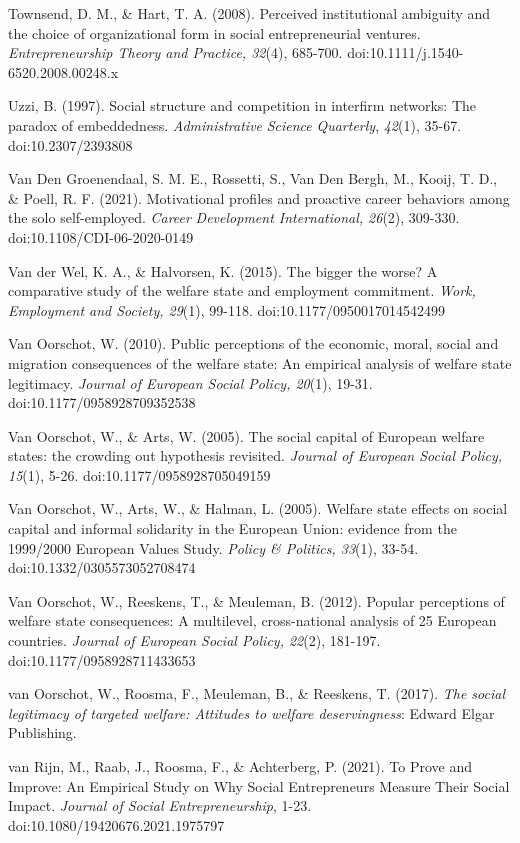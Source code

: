 \documentclass{article}
\begin{document}
Townsend, D. M., \& Hart, T. A. (2008). Perceived institutional ambiguity and the choice of organizational form in social entrepreneurial ventures. \emph{Entrepreneurship Theory and Practice, 32}(4), 685-700. doi:10.1111/j.1540-6520.2008.00248.x

Uzzi, B. (1997). Social structure and competition in interfirm networks: The paradox of embeddedness. \emph{Administrative}\emph{ }\emph{Science}\emph{ }\emph{Quarterly}, \emph{42}(1), 35-67. doi:10.2307/2393808

Van Den Groenendaal, S. M. E., Rossetti, S., Van Den Bergh, M., Kooij, T. D., \& Poell, R. F. (2021). Motivational profiles and proactive career behaviors among the solo self-employed. \emph{Career}\emph{ Development International, 26}(2), 309-330. doi:10.1108/CDI-06-2020-0149

Van der Wel, K. A., \& Halvorsen, K. (2015). The bigger the worse? A comparative study of the welfare state and employment commitment. \emph{Work, Employment and Society, 29}(1), 99-118. doi:10.1177/0950017014542499

Van Oorschot, W. (2010). Public perceptions of the economic, moral, social and migration consequences of the welfare state: An empirical analysis of welfare state legitimacy. \emph{Journal of European Social Policy, 20}(1), 19-31. doi:10.1177/0958928709352538

Van Oorschot, W., \& Arts, W. (2005). The social capital of European welfare states: the crowding out hypothesis revisited. \emph{Journal of European Social Policy, 15}(1), 5-26. doi:10.1177/0958928705049159 

Van Oorschot, W., Arts, W., \& Halman, L. (2005). Welfare state effects on social capital and informal solidarity in the European Union: evidence from the 1999/2000 European Values Study. \emph{Policy \& Politics, 33}(1), 33-54. doi:10.1332/0305573052708474

Van Oorschot, W., Reeskens, T., \& Meuleman, B. (2012). Popular perceptions of welfare state consequences: A multilevel, cross-national analysis of 25 European countries. \emph{Journal of European Social Policy, 22}(2), 181-197. doi:10.1177/0958928711433653

van Oorschot, W., Roosma, F., Meuleman, B., \& Reeskens, T. (2017). \emph{The social legitimacy of targeted welfare: Attitudes to welfare deservingness}: Edward Elgar Publishing.

van Rijn, M., Raab, J., Roosma, F., \& Achterberg, P. (2021). To Prove and Improve: An Empirical Study on Why Social Entrepreneurs Measure Their Social Impact. \emph{Journal of Social Entrepreneurship}, 1-23. doi:10.1080/19420676.2021.1975797
\end{document}
